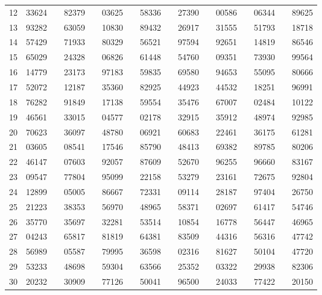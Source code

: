 \begin{center}
\begin{tabular}{cccc cccc cccc cccc}
12 & 33624 & \quad & 82379 & \quad & 03625 & \quad & 58336 & \quad & 27390 & \quad & 00586 & \quad & 06344 & \quad & 89625 \\
13 & 93282 & \quad & 63059 & \quad & 10830 & \quad & 89432 & \quad & 26917 & \quad & 31555 & \quad & 51793 & \quad & 18718 \\
14 & 57429 & \quad & 71933 & \quad & 80329 & \quad & 56521 & \quad & 97594 & \quad & 92651 & \quad & 14819 & \quad & 86546 \\
15 & 65029 & \quad & 24328 & \quad & 06826 & \quad & 61448 & \quad & 54760 & \quad & 09351 & \quad & 73930 & \quad & 99564 \\
\hline
16 & 14779 & \quad & 23173 & \quad & 97183 & \quad & 59835 & \quad & 69580 & \quad & 94653 & \quad & 55095 & \quad & 80666 \\
17 & 52072 & \quad & 12187 & \quad & 35360 & \quad & 82925 & \quad & 44923 & \quad & 44532 & \quad & 18251 & \quad & 96991 \\
18 & 76282 & \quad & 91849 & \quad & 17138 & \quad & 59554 & \quad & 35476 & \quad & 67007 & \quad & 02484 & \quad & 10122 \\
19 & 46561 & \quad & 33015 & \quad & 04577 & \quad & 02178 & \quad & 32915 & \quad & 35912 & \quad & 48974 & \quad & 92985 \\
20 & 70623 & \quad & 36097 & \quad & 48780 & \quad & 06921 & \quad & 60683 & \quad & 22461 & \quad & 36175 & \quad & 61281 \\
\hline
21 & 03605 & \quad & 08541 & \quad & 17546 & \quad & 85790 & \quad & 48413 & \quad & 69382 & \quad & 89785 & \quad & 80206 \\
22 & 46147 & \quad & 07603 & \quad & 92057 & \quad & 87609 & \quad & 52670 & \quad & 96255 & \quad & 96660 & \quad & 83167 \\
23 & 09547 & \quad & 77804 & \quad & 95099 & \quad & 22158 & \quad & 53279 & \quad & 23161 & \quad & 72675 & \quad & 92804 \\
24 & 12899 & \quad & 05005 & \quad & 86667 & \quad & 72331 & \quad & 09114 & \quad & 28187 & \quad & 97404 & \quad & 26750 \\
25 & 21223 & \quad & 38353 & \quad & 56970 & \quad & 48965 & \quad & 58371 & \quad & 02697 & \quad & 61417 & \quad & 54746 \\
\hline
26 & 35770 & \quad & 35697 & \quad & 32281 & \quad & 53514 & \quad & 10854 & \quad & 16778 & \quad & 56447 & \quad & 46965 \\
27 & 04243 & \quad & 65817 & \quad & 81819 & \quad & 64381 & \quad & 83509 & \quad & 44316 & \quad & 56316 & \quad & 47742 \\
28 & 56989 & \quad & 05587 & \quad & 79995 & \quad & 36598 & \quad & 02316 & \quad & 81627 & \quad & 50104 & \quad & 47720 \\
29 & 53233 & \quad & 48698 & \quad & 59304 & \quad & 63566 & \quad & 25352 & \quad & 03322 & \quad & 29938 & \quad & 82306 \\
30 & 20232 & \quad & 30909 & \quad & 77126 & \quad & 50041 & \quad & 96500 & \quad & 24033 & \quad & 77422 & \quad & 20150 \\
\hline
\end{tabular}
\end{center}



